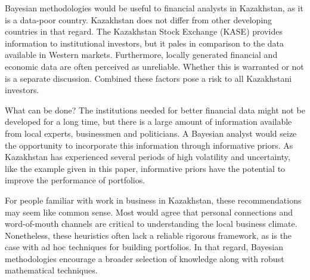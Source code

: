 \documentclass[a4paper]{article}\usepackage[]{graphicx}\usepackage[]{color}
\begin{document}
Bayesian methodologies would be useful to financial analysts in Kazakhstan, as it is a data-poor country. Kazakhstan does not differ from other developing countries in that regard. The Kazakhstan Stock Exchange (KASE) provides information to institutional investors, but it pales in comparison to the data available in Western markets. Furthermore, locally generated financial and economic data are often perceived as unreliable. Whether this is warranted or not is a separate discussion. Combined these factors pose a risk to all Kazakhstani investors.

What can be done? The institutions needed for better financial data might not be developed for a long time, but there is a large amount of information available from local experts, businessmen and politicians. A Bayesian analyst would seize the opportunity to incorporate this information through informative priors. As Kazakhstan has experienced several periods of high volatility and uncertainty, like the example given in this paper, informative priors have the potential to improve the performance of portfolios. 

For people familiar with work in business in Kazakhstan, these recommendations may seem like common sense. Most would agree that personal connections and word-of-mouth channels are critical to understanding the local business climate. Nonetheless, these heuristics often lack a reliable rigorous framework, as is the case with ad hoc techniques for building portfolios. In that regard, Bayesian methodologies encourage a broader selection of knowledge along with robust mathematical techniques.
\end{document}
